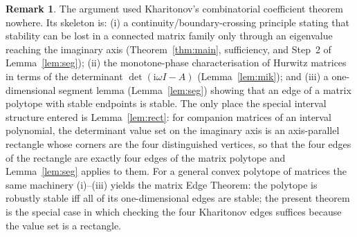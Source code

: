 \documentclass[12pt]{article}
\theoremstyle{definition}
\newtheorem{remark}{Remark}
\newcommand{\jj}{\mathrm{i}}
\begin{document}
\begin{remark}\label{rem:gen}
The argument used Kharitonov's combinatorial coefficient theorem nowhere. Its skeleton is:
(i) a continuity/boundary-crossing principle stating that stability can be lost in a
connected matrix family only through an eigenvalue reaching the imaginary axis
(Theorem~\ref{thm:main}, sufficiency, and Step~2 of Lemma~\ref{lem:seg}); (ii) the
monotone-phase characterisation of Hurwitz matrices in terms of the determinant
$\det(\jj\omega I-A)$ (Lemma~\ref{lem:mik}); and (iii) a one-dimensional segment lemma
(Lemma~\ref{lem:seg}) showing that an edge of a matrix polytope with stable endpoints is
stable. The only place the special interval structure entered is Lemma~\ref{lem:rect}: for
companion matrices of an interval polynomial, the determinant value set on the imaginary
axis is an axis-parallel rectangle whose corners are the four distinguished vertices, so
that the four edges of the rectangle are exactly four edges of the matrix polytope and
Lemma~\ref{lem:seg} applies to them. For a general convex polytope of matrices the same
machinery (i)–(iii) yields the matrix Edge Theorem: the polytope is robustly stable iff
all of its one-dimensional edges are stable; the present theorem is the special case in
which checking the four Kharitonov edges suffices because the value set is a rectangle.
\end{remark}
\end{document}
